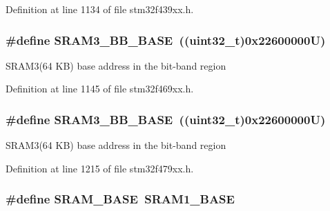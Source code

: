 Definition at line 1134 of file stm32f439xx.\+h.

\subsubsection[{\texorpdfstring{S\+R\+A\+M3\+\_\+\+B\+B\+\_\+\+B\+A\+SE}{SRAM3_BB_BASE}}]{\setlength{\rightskip}{0pt plus 5cm}\#define S\+R\+A\+M3\+\_\+\+B\+B\+\_\+\+B\+A\+SE~((uint32\+\_\+t)0x22600000\+U)}\hypertarget{group___peripheral__memory__map_gaebfa4db60f9ac39c7c7f3fed98090410}{}\label{group___peripheral__memory__map_gaebfa4db60f9ac39c7c7f3fed98090410}
S\+R\+A\+M3(64 K\+B) base address in the bit-\/band region 

Definition at line 1145 of file stm32f469xx.\+h.

\subsubsection[{\texorpdfstring{S\+R\+A\+M3\+\_\+\+B\+B\+\_\+\+B\+A\+SE}{SRAM3_BB_BASE}}]{\setlength{\rightskip}{0pt plus 5cm}\#define S\+R\+A\+M3\+\_\+\+B\+B\+\_\+\+B\+A\+SE~((uint32\+\_\+t)0x22600000\+U)}\hypertarget{group___peripheral__memory__map_gaebfa4db60f9ac39c7c7f3fed98090410}{}\label{group___peripheral__memory__map_gaebfa4db60f9ac39c7c7f3fed98090410}
S\+R\+A\+M3(64 K\+B) base address in the bit-\/band region 

Definition at line 1215 of file stm32f479xx.\+h.

\subsubsection[{\texorpdfstring{S\+R\+A\+M\+\_\+\+B\+A\+SE}{SRAM_BASE}}]{\setlength{\rightskip}{0pt plus 5cm}\#define S\+R\+A\+M\+\_\+\+B\+A\+SE~{\bf S\+R\+A\+M1\+\_\+\+B\+A\+SE}}\hypertarget{group___peripheral__memory__map_ga05e8f3d2e5868754a7cd88614955aecc}{}\label{group___peripheral__memory__map_ga05e8f3d2e5868754a7cd88614955aecc}


